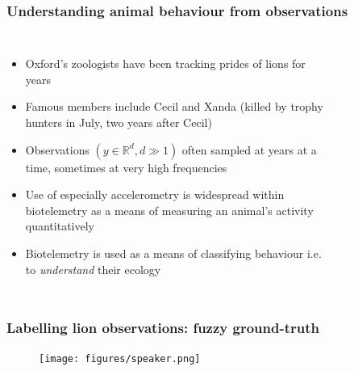 \documentclass[aspectratio=169]{beamer}
\begin{document}

\begin{frame}[plain]
    \frametitle{Understanding animal behaviour from observations} 
    \begin{columns}[t] %


        \begin{itemize}
            \small
        \item Oxford's zoologists have been tracking prides of lions for years 
        \item Famous members include Cecil and Xanda (killed by trophy hunters in July, two years after Cecil)
        \item Observations $(y \in \mathbb{R}^d, d\gg1)$ often sampled at years at a time, sometimes at very high frequencies 
        \item Use of especially accelerometry is widespread within biotelemetry as a means of measuring an animal’s activity quantitatively
        \item Biotelemetry is used as a means of classifying behaviour i.e. to \emph{understand} their ecology
    \end{itemize}

    \vspace{-2em}
    \begin{figure}[ht]
        \\[-0em]
    \end{figure}
\end{columns}
\end{frame}

\begin{frame}
    \frametitle{Labelling lion observations: fuzzy ground-truth}

    \begin{figure}
        \centering
        \texttt{[image: figures/speaker.png]}
    \end{figure}


\end{frame}
\end{document}
